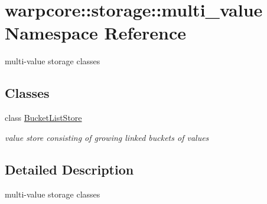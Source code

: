 \hypertarget{namespacewarpcore_1_1storage_1_1multi__value}{}\section{warpcore\+:\+:storage\+:\+:multi\+\_\+value Namespace Reference}
\label{namespacewarpcore_1_1storage_1_1multi__value}


multi-\/value storage classes  


\subsection*{Classes}
\begin{DoxyCompactItemize}
\item 
class \hyperlink{classwarpcore_1_1storage_1_1multi__value_1_1BucketListStore}{Bucket\+List\+Store}
\begin{DoxyCompactList}\small\item\em value store consisting of growing linked buckets of values \end{DoxyCompactList}\end{DoxyCompactItemize}


\subsection{Detailed Description}
multi-\/value storage classes 